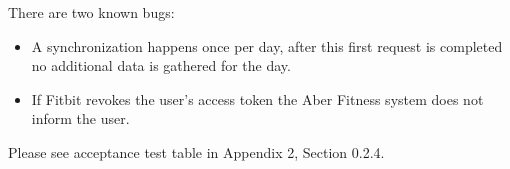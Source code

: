 
There are two known bugs:
\begin{itemize}
    \item A synchronization happens once per day, after this first request is completed no additional data is gathered for the day.
    \item If Fitbit revokes the user's access token the Aber Fitness system does not inform the user.
\end{itemize}

Please see acceptance test table in Appendix 2, Section 0.2.4.
